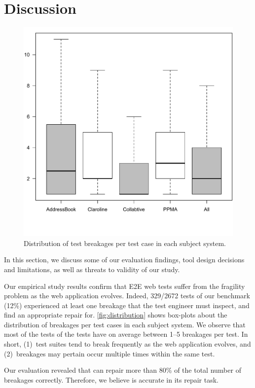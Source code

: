 \section{Discussion}\label{sec:discussion} 

\begin{figure}[t]
\centering
\includegraphics[trim={0cm 0cm 0cm 0cm}, clip,width=0.8\columnwidth]{images/distribution.pdf}
\caption{Distribution of test breakages per test case in each subject system.}
\label{fig:distribution}
\end{figure} 

In this section, we discuss some of our evaluation findings, tool design decisions and limitations, as well as threats to validity of our study.

 Our empirical study results confirm that E2E web tests suffer from the fragility problem as the web application evolves. Indeed, 329/2672 tests of our benchmark (12\%) experienced at least one breakage that the test engineer must inspect, and find an appropriate repair for. 
\autoref{fig:distribution} shows box-plots about the distribution of breakages per test cases in each subject system. We observe that most of the tests of the tests have on average between 1--5 breakages per test. 
In short, (1)~test suites tend to break frequently as the web application evolves, and (2)~breakages may pertain occur multiple times within the same test. 

Our evaluation revealed that \tool can repair more than 80\% of the total number of breakages correctly. Therefore, we believe \tool is accurate in its repair task.

